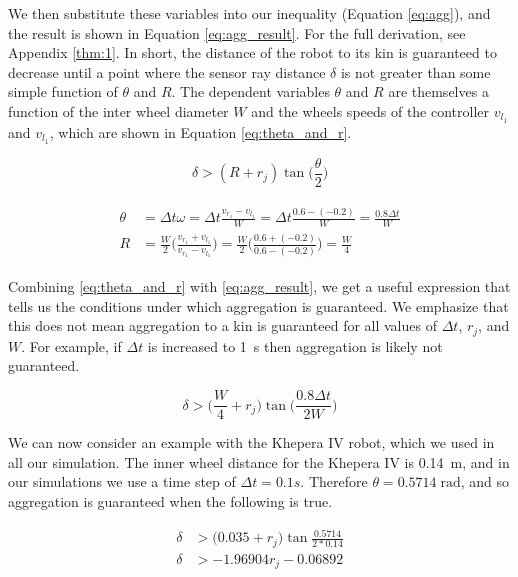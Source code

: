 \documentclass[conference]{IEEEtran}
\begin{document}
  We then substitute these variables into our inequality (Equation \ref{eq:agg}), and the result is shown in Equation \ref{eq:agg_result}. For the full derivation, see Appendix \ref{thm:1}. In short, the distance of the robot to its kin is guaranteed to decrease until a point where the sensor ray distance $\delta$ is not greater than some simple function of $\theta$ and $R$. The dependent variables $\theta$ and $R$ are themselves a function of the inter wheel diameter $W$ and the wheels speeds of the controller $v_{l_1}$ and $v_{l_1}$, which are shown in Equation \ref{eq:theta_and_r}.

  \begin{equation} \label{eq:agg_result}
    \delta > (R + r_j)\tan\bigg(\frac{\theta}{2}\bigg)
  \end{equation}

  \begin{align}
    \begin{split} \label{eq:theta_and_r}
      \theta &= \Delta t\omega = \Delta t \frac{v_{r_1} - v_{l_1}}{W} = \Delta t \frac{0.6 - (-0.2)}{W} = \frac{0.8\Delta t}{W} \\
      R &= \frac{W}{2}\bigg(\frac{v_{r_1} + v_{l_1}}{v_{r_1} - v_{l_1}}\bigg) = \frac{W}{2}\bigg(\frac{0.6 + (-0.2)}{0.6 - (-0.2)}\bigg) = \frac{W}{4}
    \end{split}
  \end{align}

  Combining \ref{eq:theta_and_r} with \ref{eq:agg_result}, we get a useful expression that tells us the conditions under which aggregation is guaranteed. We emphasize that this does not mean aggregation to a kin is guaranteed for all values of $\Delta t$, $r_j$, and $W$. For example, if $\Delta t$ is increased to \SI{1}{\second} then aggregation is likely not guaranteed.

  \begin{equation*} \label{eq:agg_final_result}
    \delta > \bigg(\frac{W}{4} + r_j\bigg)\tan\bigg(\frac{0.8\Delta t}{2W}\bigg)
  \end{equation*}

  We can now consider an example with the Khepera IV robot, which we used in all our simulation. The inner wheel distance for the Khepera IV is \SI{0.14}{\meter}, and in our simulations we use a time step of $\Delta t = 0.1s$. Therefore $\theta = 0.5714\;\text{rad}$, and so aggregation is guaranteed when the following is true.

  \begin{equation} \label{eq:khephera_agg}
    \begin{split}
      \delta &> \bigg(0.035 + r_j\bigg)\tan\frac{0.5714}{2*0.14} \\
      \delta &> -1.96904 r_j - 0.06892
    \end{split}
  \end{equation}
\end{document}
